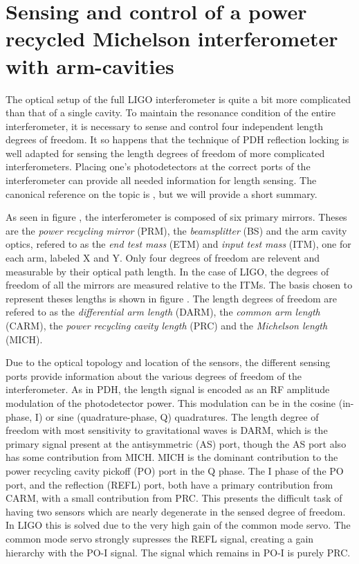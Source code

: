 \section{Sensing and control of a power recycled Michelson interferometer with arm-cavities}
The optical setup of the full LIGO interferometer is quite a bit more complicated than that of a single cavity. %
To maintain the resonance condition of the entire interferometer, it is necessary to sense and control four independent length degrees of freedom. %
It so happens that the technique of PDH reflection locking is well adapted for sensing the length degrees of freedom of more complicated interferometers. %
Placing one's photodetectors at the correct ports of the interferometer can provide all needed information for length sensing. %
The canonical reference on the topic is \citet{Fritschel:01}, but we will provide a short summary.

As seen in figure , the interferometer is composed of six primary mirrors. %
Theses are the \emph{power recycling mirror} (PRM), the \emph{beamsplitter} (BS) and the arm cavity optics, refered to as the \emph{end test mass} (ETM) and \emph{input test mass} (ITM), one for each arm, labeled X and Y. %
Only four degrees of freedom are relevent and measurable by their optical path length. %
In the case of LIGO, the degrees of freedom of all the mirrors are measured relative to the ITMs. %
The basis chosen to represent theses lengths is shown in figure . %
The length degrees of freedom are refered to as the \emph{differential arm length} (DARM), the \emph{common arm length} (CARM), the \emph{power recycling cavity length} (PRC) and the \emph{Michelson length} (MICH).

Due to the optical topology and location of the sensors, the different sensing ports provide information about the various degrees of freedom of the interferometer. %
As in PDH, the length signal is encoded as an RF amplitude modulation of the photodetector power. %
This modulation can be in the cosine (in-phase, I) or sine (quadrature-phase, Q) quadratures. %
The length degree of freedom with most sensitivity to gravitational waves is DARM, which is the primary signal present at the antisymmetric (AS) port, though the AS port also has some contribution from MICH. %
MICH is the dominant contribution to the power recycling cavity pickoff (PO) port in the Q phase. %
The I phase of the PO port, and the reflection (REFL) port, both have a primary contribution from CARM, with a small contribution from PRC. %
This presents the difficult task of having two sensors which are nearly degenerate in the sensed degree of freedom. %
In LIGO this is solved due to the very high gain of the common mode servo. %
The common mode servo strongly supresses the REFL signal, creating a gain hierarchy with the PO-I signal. %
The signal which remains in PO-I is purely PRC.

